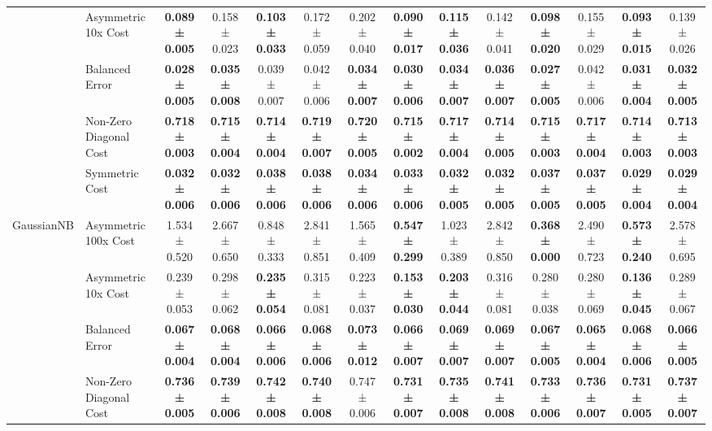 \begin{table}[H]
{\begin{tabular}{llcccccccccccc}
 & Asymmetric 10x Cost & \textbf{0.089 ± 0.005} & 0.158 ± 0.023 & \textbf{0.103 ± 0.033} & 0.172 ± 0.059 & 0.202 ± 0.040 & \textbf{0.090 ± 0.017} & \textbf{0.115 ± 0.036} & 0.142 ± 0.041 & \textbf{0.098 ± 0.020} & 0.155 ± 0.029 & \textbf{0.093 ± 0.015} & 0.139 ± 0.026 \\
 & Balanced Error & \textbf{0.028 ± 0.005} & \textbf{0.035 ± 0.008} & 0.039 ± 0.007 & 0.042 ± 0.006 & \textbf{0.034 ± 0.007} & \textbf{0.030 ± 0.006} & \textbf{0.034 ± 0.007} & \textbf{0.036 ± 0.007} & \textbf{0.027 ± 0.005} & 0.042 ± 0.006 & \textbf{0.031 ± 0.004} & \textbf{0.032 ± 0.005} \\
 & Non-Zero Diagonal Cost & \textbf{0.718 ± 0.003} & \textbf{0.715 ± 0.004} & \textbf{0.714 ± 0.004} & \textbf{0.719 ± 0.007} & \textbf{0.720 ± 0.005} & \textbf{0.715 ± 0.002} & \textbf{0.717 ± 0.004} & \textbf{0.714 ± 0.005} & \textbf{0.715 ± 0.003} & \textbf{0.717 ± 0.004} & \textbf{0.714 ± 0.003} & \textbf{0.713 ± 0.003} \\
 & Symmetric Cost & \textbf{0.032 ± 0.006} & \textbf{0.032 ± 0.006} & \textbf{0.038 ± 0.006} & \textbf{0.038 ± 0.006} & \textbf{0.034 ± 0.006} & \textbf{0.033 ± 0.006} & \textbf{0.032 ± 0.005} & \textbf{0.032 ± 0.005} & \textbf{0.037 ± 0.005} & \textbf{0.037 ± 0.005} & \textbf{0.029 ± 0.004} & \textbf{0.029 ± 0.004} \\
\cline{1-14}
\multirow[t]{5}{*}{GaussianNB} & Asymmetric 100x Cost & 1.534 ± 0.520 & 2.667 ± 0.650 & 0.848 ± 0.333 & 2.841 ± 0.851 & 1.565 ± 0.409 & \textbf{0.547 ± 0.299} & 1.023 ± 0.389 & 2.842 ± 0.850 & \textbf{0.368 ± 0.000} & 2.490 ± 0.723 & \textbf{0.573 ± 0.240} & 2.578 ± 0.695 \\
 & Asymmetric 10x Cost & 0.239 ± 0.053 & 0.298 ± 0.062 & \textbf{0.235 ± 0.054} & 0.315 ± 0.081 & 0.223 ± 0.037 & \textbf{0.153 ± 0.030} & \textbf{0.203 ± 0.044} & 0.316 ± 0.081 & 0.280 ± 0.038 & 0.280 ± 0.069 & \textbf{0.136 ± 0.045} & 0.289 ± 0.067 \\
 & Balanced Error & \textbf{0.067 ± 0.004} & \textbf{0.068 ± 0.004} & \textbf{0.066 ± 0.006} & \textbf{0.068 ± 0.006} & \textbf{0.073 ± 0.012} & \textbf{0.066 ± 0.007} & \textbf{0.069 ± 0.007} & \textbf{0.069 ± 0.007} & \textbf{0.067 ± 0.005} & \textbf{0.065 ± 0.004} & \textbf{0.068 ± 0.006} & \textbf{0.066 ± 0.005} \\
 & Non-Zero Diagonal Cost & \textbf{0.736 ± 0.005} & \textbf{0.739 ± 0.006} & \textbf{0.742 ± 0.008} & \textbf{0.740 ± 0.008} & 0.747 ± 0.006 & \textbf{0.731 ± 0.007} & \textbf{0.735 ± 0.008} & \textbf{0.741 ± 0.008} & \textbf{0.733 ± 0.006} & \textbf{0.736 ± 0.007} & \textbf{0.731 ± 0.005} & \textbf{0.737 ± 0.007} \\

\end{tabular}}
\end{table}
